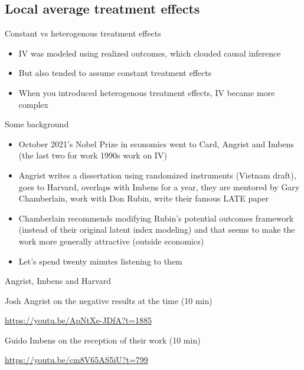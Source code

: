 \documentclass{beamer}
\begin{document}
\subsection{Local average treatment effects}

\begin{frame}{Constant vs heterogenous treatment effects}

\begin{itemize}
\item IV was modeled using realized outcomes, which clouded causal inference
\item But also tended to assume constant treatment effects
\item When you introduced heterogenous treatment effects, IV became more complex 
\end{itemize}

\end{frame}

\begin{frame}{Some background}

\begin{itemize}
\item October 2021's Nobel Prize in economics went to Card, Angrist and Imbens (the last two for work 1990s work on IV)
\item Angrist writes a dissertation using randomized instruments (Vietnam draft), goes to Harvard, overlaps with Imbens for a year, they are mentored by Gary Chamberlain, work with Don Rubin, write their famous LATE paper
\item Chamberlain recommends modifying Rubin's potential outcomes framework (instead of their original latent index modeling) and that seems to make the work more generally attractive (outside economics)
\item Let's spend twenty minutes listening to them
\end{itemize}

\end{frame}

\begin{frame}{Angrist, Imbens and Harvard}


Josh Angrist on the negative results at the time (10 min)

\url{https://youtu.be/ApNtXe-JDfA?t=1885}

Guido Imbens on the reception of their work (10 min)

\url{https://youtu.be/cm8V65AS5iU?t=799}

\end{frame}
\end{document}
